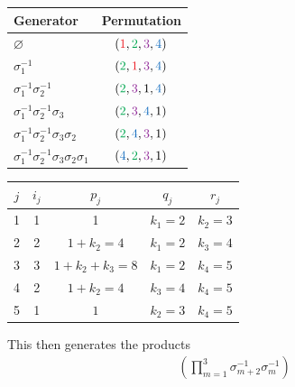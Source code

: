 \begin{example}
    \begin{center}
        \begin{tabular}{|l|c|}
            \hline
            Generator & Permutation\\
            \hline
            $\varnothing$ & $(\textcolor{Red}{1}, \textcolor{Green}{2}, \textcolor{Purple}{3}, \textcolor{RoyalBlue}{4})$\\
            \hline
            $\sigma_1^{-1}$ & $(\textcolor{Green}{2}, \textcolor{Red}{1}, \textcolor{Purple}{3}, \textcolor{RoyalBlue}{4})$\\
            \hline
            $\sigma_1^{-1}\sigma_2^{-1}$ & $(\textcolor{Green}{2}, \textcolor{Purple}{3}, 1, \textcolor{RoyalBlue}{4})$\\
            \hline
            $\sigma_1^{-1}\sigma_2^{-1}\sigma_3$ & $(\textcolor{Green}{2}, \textcolor{Purple}{3}, \textcolor{RoyalBlue}{4}, 1)$\\
            \hline
            $\sigma_1^{-1}\sigma_2^{-1}\sigma_3\sigma_2$ & $(\textcolor{Green}{2}, \textcolor{RoyalBlue}{4}, \textcolor{Purple}{3}, 1)$\\
            \hline
            $\sigma_1^{-1}\sigma_2^{-1}\sigma_3\sigma_2\sigma_1$ & $(\textcolor{RoyalBlue}{4}, \textcolor{Green}{2}, \textcolor{Purple}{3}, 1)$\\
            \hline
        \end{tabular}
        \hspace{1cm}
        \begin{tabular}{|c|c |c| c| c|} 
            \hline
            $j$ & $i_{j}$ & $p_j$ & $q_j$ & $r_j$ \\ [1ex] 
            \hline
            1 & 1 & 1 & $k_1 = 2$  & $k_2 = 3$  \\ [.1ex] 
            \hline
            2 & 2 & $1 + k_2 = 4$ & $k_1 =2$ & $k_3 = 4$ \\ [.1ex] 
            \hline
            3 & 3 & $1 + k_2 + k_3 = 8$ & $k_1 = 2$ & $k_4 = 5$ \\ [.1ex] 
            \hline
            4 & 2 & $1 + k_2 = 4$ & $k_3 =4$ & $k_4 = 5$ \\[.1ex] 
            \hline
            5 & 1 & $1$ & $k_2 = 3$ & $k_4 = 5$\\ [1ex] 
            \hline
           \end{tabular}
    \end{center}
    This then generates the products 
    \begin{gather*}
        \left(\prod_{m = 1}^{3}\sigma_{m + 2}^{-1}\sigma^{-1}_m\right)

\end{gather*}
\end{example}

